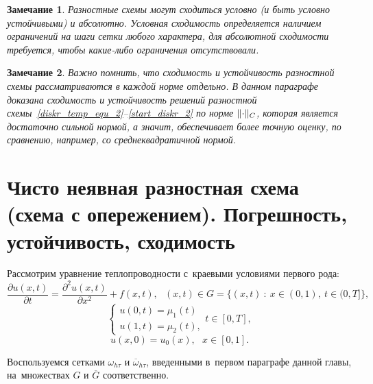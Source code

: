 \documentclass[11pt,a4paper,twoside]{report}
\numberwithin{equation}{section}
\theoremstyle{definition}
\theoremstyle{plain}
\newtheorem{note}{Замечание}[section]
\DeclarePairedDelimiter\norm{\lVert}{\rVert}
\begin{document}
%
\begin{note}
%
    Разностные схемы могут сходиться условно (и быть условно устойчивыми) и
    абсолютно. Условная сходимость определяется наличием ограничений на шаги
    сетки любого характера, для абсолютной сходимости требуется, чтобы
    какие-либо ограничения отсутствовали.
%
\end{note}
%
\begin{note}
%
    Важно помнить, что сходимость и устойчивость разностной схемы рассматриваются
    в каждой норме отдельно. В данном параграфе доказана сходимость и
    устойчивость решений разностной схемы~\eqref{diskr_temp_equ_2}–\eqref{start_diskr_2}
    по норме $\norm{\cdot}_C$, которая
    является достаточно сильной нормой, а значит, обеспечивает более точную оценку,
    по сравнению, например, со среднеквадратичной нормой.
%
\end{note}
%


\section[Чисто неявная разностная схема]
{Чисто неявная разностная схема (схема с опережением). Погрешность, устойчивость, сходимость}
%
Рассмотрим уравнение теплопроводности с~краевыми условиями первого рода:
%
\begin{equation}
%
    \label{temp_equ_3}
    \frac{\partial u(x,t)}{\partial t} =
    \frac{\partial^2u(x,t)}{\partial x^2} + f(x,t),
    ~~~(x,t) \in G = \{(x, t)~:~x \in (0,1),~t\in (0,T]\},
%
\end{equation}
%
%
\begin{equation}
%
    \label{bord_3}
    \begin{cases}
        u(0,t) = \mu_1(t) \\
        u(1,t) = \mu_2(t),
    \end{cases}
    t\in [0,T],
%
\end{equation}
%
%
\begin{equation}
%
    \label{start_val_3}
    u(x,0) = u_0(x),~~~x\in[0,1].
%
\end{equation}

Воспользуемся сетками $\omega_{h \tau}$ и $\overline{\omega}_{h \tau}$,
введенными в~первом параграфе данной главы, на~множествах $G$ и
$\overline{G}$ соответственно.
\end{document}

